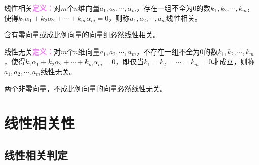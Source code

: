 线性相关\textcolor{violet}{\textbf{定义：}}对$m$个$n$维向量$a_1,a_2,\cdots,a_m$，存在一组不全为0的数$k_1,k_2,\cdots,k_m$，使得$k_1\alpha_1+k_2\alpha_2+\cdots+k_m\alpha_m=0$，则称$a_1,a_2,\cdots,a_m$线性相关。

含有零向量或成比例向量的向量组必然线性相关。

线性无关\textcolor{violet}{\textbf{定义：}}对$m$个$n$维向量$a_1,a_2,\cdots,a_m$，不存在一组不全为0的数$k_1,k_2,\cdots,k_m$，使得$k_1\alpha_1+k_2\alpha_2+\cdots+k_m\alpha_m=0$，即仅当$k_1=k_2=\cdots=k_m=0$才成立，则称$a_1,a_2,\cdots,a_m$线性无关。

两个非零向量，不成比例向量的向量必然线性无关。

\section{线性相关性}

\subsection{线性相关判定}

